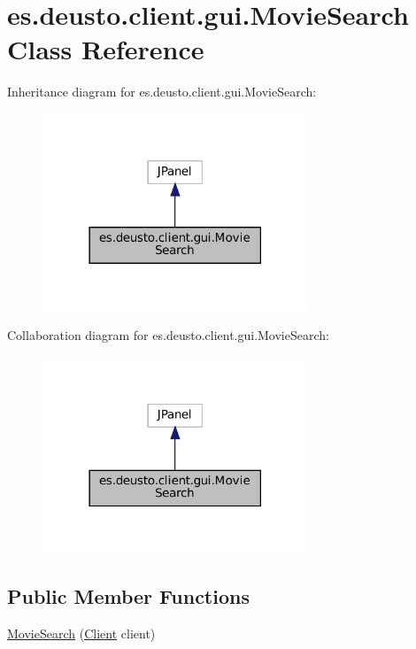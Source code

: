 \hypertarget{classes_1_1deusto_1_1client_1_1gui_1_1_movie_search}{}\section{es.\+deusto.\+client.\+gui.\+Movie\+Search Class Reference}
\label{classes_1_1deusto_1_1client_1_1gui_1_1_movie_search}


Inheritance diagram for es.\+deusto.\+client.\+gui.\+Movie\+Search\+:\nopagebreak
\begin{figure}[H]
\begin{center}
\leavevmode
\includegraphics[width=225pt]{classes_1_1deusto_1_1client_1_1gui_1_1_movie_search__inherit__graph}
\end{center}
\end{figure}


Collaboration diagram for es.\+deusto.\+client.\+gui.\+Movie\+Search\+:\nopagebreak
\begin{figure}[H]
\begin{center}
\leavevmode
\includegraphics[width=225pt]{classes_1_1deusto_1_1client_1_1gui_1_1_movie_search__coll__graph}
\end{center}
\end{figure}
\subsection*{Public Member Functions}
\begin{DoxyCompactItemize}
\item 
\mbox{\hyperlink{classes_1_1deusto_1_1client_1_1gui_1_1_movie_search_a20d7badf9735287b4da03a9eb3cf09f4}{Movie\+Search}} (\mbox{\hyperlink{classes_1_1deusto_1_1client_1_1_client}{Client}} client)
\end{DoxyCompactItemize}


